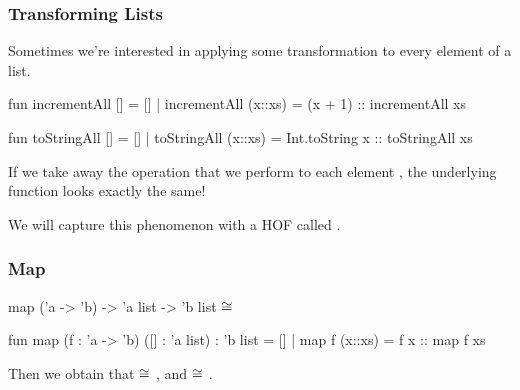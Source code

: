 \documentclass[aspectratio=169]{beamer}
\begin{document}
\begin{frame}[fragile]
  \frametitle{Transforming Lists}

  Sometimes we're interested in applying some transformation to every element of a list.

  \pause
  \vspace{\fill}

  \begin{codeblock}
    fun incrementAll [] = []
      | incrementAll (x::xs) = (x + 1) :: incrementAll xs

    fun toStringAll [] = []
      | toStringAll (x::xs) = Int.toString x :: toStringAll xs
  \end{codeblock}

  \vspace{\fill}
  \pause

  If we take away the operation that we perform to each element , the underlying
  function looks exactly the same!

  \pause
  \vspace{\fill}

  We will capture this phenomenon with a HOF called .
\end{frame}

\begin{frame}[fragile]
  \frametitle{Map}

  \spec
    {map}
    {('a -> 'b) -> 'a list -> 'b list}
    {}
    { $\cong$ \code{[f x1, ..., f xn]}}

  \pause
  \vspace{\fill}

  \begin{codeblock}
    fun map (f : 'a -> 'b) ([] : 'a list) : 'b list = []
      | map f (x::xs) = f x :: map f xs
  \end{codeblock}

  \pause
  \vspace{\fill}

  Then we obtain that  $\cong$ ,
  and  $\cong$ .
\end{frame}
\end{document}
